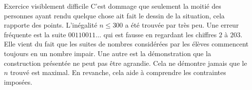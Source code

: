 Exercice visiblement difficile
C'est dommage que seulement la moitié des personnes ayant rendu quelque chose ait fait le dessin de la situation, cela rapporte des points. L'inégalité $n \leq 300$ a été trouvée par très peu. Une erreur fréquente est la suite $00110011\ldots$ qui est fausse en regardant les chiffres $2$ à $203$. Elle vient du fait que les suites de nombres considérées par les élèves commencent toujours en un nombre impair.
Une autre est la démonstration que la construction présentée ne peut pas être agrandie. Cela ne démontre jamais que le $n$ trouvé est maximal. En revanche, cela aide à comprendre les contraintes imposées.